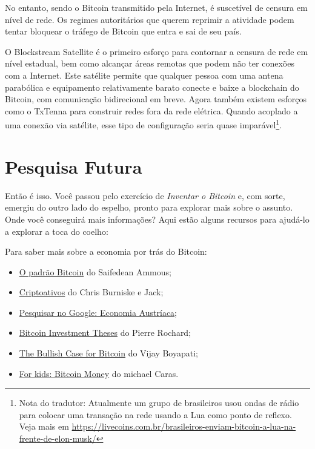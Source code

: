 No entanto, sendo o Bitcoin transmitido pela Internet, é suscetível de censura em nível de rede. Os regimes autoritários que querem reprimir a atividade podem tentar bloquear o tráfego de Bitcoin que entra e sai de seu país.

O Blockstream Satellite é o primeiro esforço para contornar a censura de rede em nível estadual, bem como alcançar áreas remotas que podem não ter conexões com a Internet. 
Este satélite permite que qualquer pessoa com uma antena parabólica e equipamento relativamente barato conecte e baixe a blockchain do Bitcoin, com comunicação bidirecional em breve. 
Agora também existem esforços como o TxTenna para construir redes fora da rede elétrica. 
Quando acoplado a uma conexão via satélite, esse tipo de configuração seria quase imparável\footnote{Nota do tradutor: Atualmente um grupo de brasileiros usou ondas de rádio para colocar uma transação na rede usando a Lua como ponto de reflexo. Veja mais em \url{https://livecoins.com.br/brasileiros-enviam-bitcoin-a-lua-na-frente-de-elon-musk/}}.


\section*{Pesquisa Futura}

Então é isso. 
Você passou pelo exercício de \textit{Inventar o Bitcoin} e, com sorte, emergiu do outro lado do espelho, pronto para explorar mais sobre o assunto.
Onde você conseguirá mais informações? Aqui estão alguns recursos para ajudá-lo a explorar a toca do coelho:

Para saber mais sobre a economia por trás do Bitcoin:

\begin{itemize}
\item \href{https://amzn.to/2V1vQ62}{O padrão Bitcoin} do Saifedean Ammous;
\item \href{https://amzn.to/3jwpiG7}{Criptoativos} do Chris Burniske e Jack;
\item \href{https://tinyurl.com/bzrkbb5u}{Pesquisar no Google: Economia Austríaca};
\item \href{https://tinyurl.com/3yn8amt3}{Bitcoin Investment Theses} do Pierre Rochard;
\item \href{https://tinyurl.com/f8e4wn5h}{The Bullish Case for Bitcoin} do Vijay Boyapati;
\item \href{https://tinyurl.com/y9mhw2ad}{For kids: Bitcoin Money} do michael Caras.
\end{itemize}

